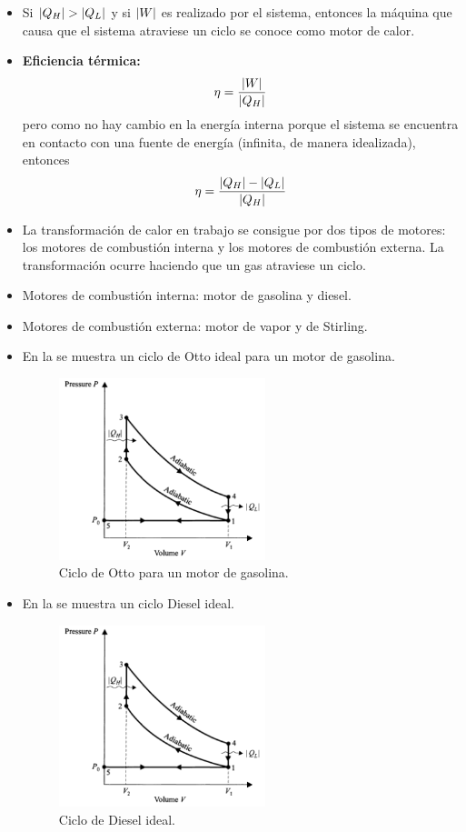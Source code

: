\begin{itemize}
\item Si $\abs{Q_H}>\abs{Q_L}$ y si $\abs{W}$ es realizado por el sistema, 
entonces la máquina que causa que el sistema atraviese
un ciclo se conoce como motor de calor.
\item \textbf{Eficiencia térmica:} 
\begin{align}
\eta=\frac{\abs{W}}{\abs{Q_H}}
\label{•}
\end{align}
pero como no hay cambio en la energía interna porque 
el sistema se encuentra en contacto con una fuente de
energía (infinita, de manera idealizada), entonces
\begin{align}
\eta=\frac{\abs{Q_H}-\abs{Q_L}}{\abs{Q_H}}
\label{eq:thermal-eff	}	
\end{align}
\item La transformación de calor en trabajo se consigue 
por dos tipos de motores: los motores de combustión
interna y los motores de combustión externa. La 
transformación ocurre haciendo que un gas atraviese
un ciclo.
\item Motores de combustión interna: motor de gasolina
y diesel.
\item Motores de combustión externa: motor de vapor
y de Stirling.
\item En la  se muestra un ciclo de Otto ideal
para un motor de gasolina.
\begin{figure}
  \centering
  \includegraphics[width=6cm]{images/otto-cycle.png}
  \caption{Ciclo de Otto para un motor de gasolina.}
  \label{fig:otto-cycle}
\end{figure}
\item En la  se muestra un ciclo Diesel ideal.
\begin{figure}
  \centering
  \includegraphics[width=6cm]{images/otto-cycle.png}
  \caption{Ciclo de Diesel ideal.}
  \label{fig:diesel-cycle}
\end{figure}


\end{itemize}
